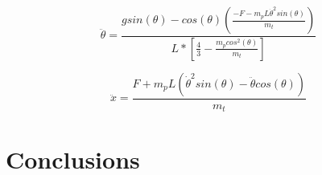 \documentclass{jfm}
\begin{document}
\cite{1606.01540}

\begin{equation}
\ddot{\theta} = \frac{g sin(\theta) - cos(\theta) \left(\frac{-F - m_{p} L \dot{\theta}^2 sin(\theta)}{m_{t}}\right)}{L * \left[\frac{4}{3} - \frac{m_{p} cos^2(\theta)}{m_{t}}\right]}
\end{equation}

\begin{equation}
\ddot{x} = \frac{F + m_{p}L\left(\dot{\theta}^2 sin(\theta) - \ddot{\theta} cos(\theta) \right)}{m_{t}}
\end{equation}



\section{Conclusions}




\end{document}
